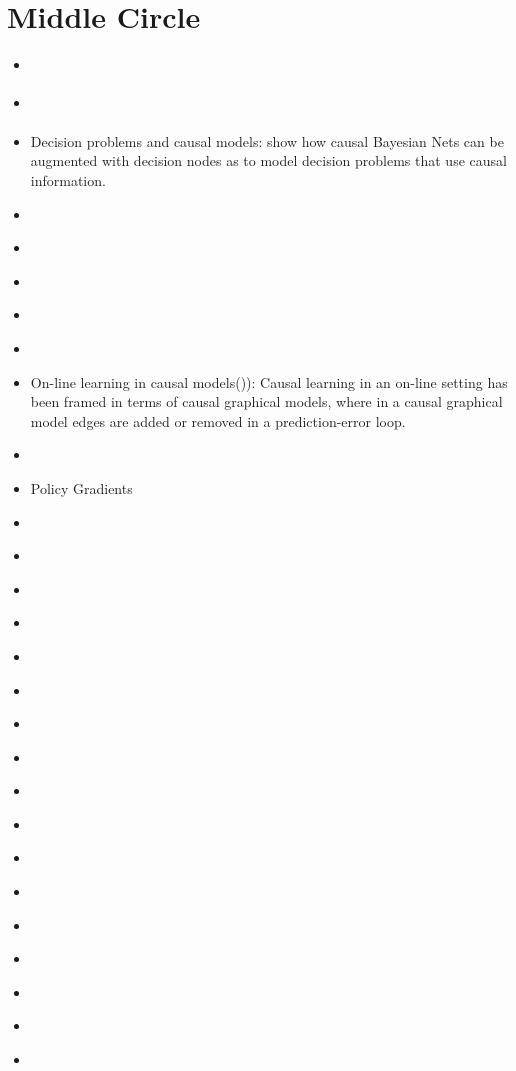\documentclass[11pt]{article}
\theoremstyle{plain}
\begin{document}
\section{Middle Circle}
\begin{itemize}
\item \cite{baxter2001infinite}
\item \cite{boyan2002technical}
\item Decision problems and causal models: \cite{dawid2002influence} show how causal Bayesian Nets can be augmented with decision nodes as to model decision problems that use causal information.
\item \cite{konda2003onactor}
\item \cite{richter2007natural}
\item \cite{hagmayer2009decision}
\item \cite{meder2009role}
\item \cite{meder2010observing}
\item On-line learning in causal models(\cite{wellen2012learning})):  Causal learning in an on-line setting has been framed in terms of causal graphical models, where in a causal graphical model edges are added or removed in a prediction-error loop.
\item \cite{grondman2012survey}
\item Policy Gradients  \cite{DBLP:journals/corr/MnihBMGLHSK16}
\item \cite{lopez2015towards}
\item \cite{NIPS2016_6234}
\item \cite{NIPS2016_6266}
\item \cite{NIPS2016_6059}
\item \cite{NIPS2016_6233}
\item \cite{NIPS2016_6042}
\item \cite{DBLP:journals/corr/SchulmanMLJA15}
\item \cite{goudet2017learning}
\item \cite{firoiu2017beating}
\item \cite{leibo2017multi}
\item \cite{amarjyoti2017deep}
\item \cite{NIPS2017_7019}
\item \cite{NIPS2017_7084}
\item \cite{NIPS2017_7134}
\item \cite{NIPS2017_6954}
\item \cite{NIPS2017_7134}
\item \cite{NIPS2017_6950}

\end{itemize}
\end{document}
